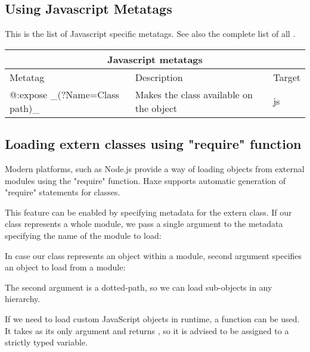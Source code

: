 \subsection{Using Javascript Metatags}
\label{target-javascript-metatags}

This is the list of Javascript specific metatags. See also the complete list of all .

\begin{center}
\begin{tabular}{| l | l | l |}
	\hline
	\multicolumn{3}{|c|}{Javascript metatags} \\ \hline
	Metatag &  Description & Target \\ \hline
	@:expose \_(?Name=Class path)\_  &  Makes the class available on the \expr{window} object  & js  \\
\end{tabular}
\end{center}

\subsection{Loading extern classes using "require" function}
\label{target-javascript-require}

Modern  platforms, such as Node.js provide a way of loading objects
from external modules using the "require" function. Haxe supports automatic generation
of "require" statements for  classes.

This feature can be enabled by specifying  metadata for the extern class. If our  class represents a whole module, we pass a single argument to the  metadata specifying the name of the module to load:


In case our  class represents an object within a module, second  argument specifies an object to load from a module:


The second argument is a dotted-path, so we can load sub-objects in any hierarchy.

If we need to load custom JavaScript objects in runtime, a  function can be used. It takes  as its only argument and returns , so it is advised to be assigned to a strictly typed variable.

